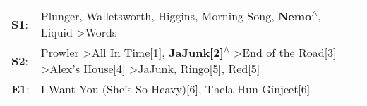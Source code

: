 \begin{supertabular}{p{0.03\textwidth}p{0.92\textwidth}}
 \textbf{S1}:  &                                                                                                 Plunger\textsuperscript{}, \enspace Walletsworth\textsuperscript{}, \enspace Higgins\textsuperscript{}, \enspace Morning Song\textsuperscript{}, \enspace \textbf{Nemo\textsuperscript{$\wedge$}}, \enspace Liquid\textsuperscript{} \textgreater \enspace Words\textsuperscript{}  \enspace  \\
 \textbf{S2}:  &  Prowler\textsuperscript{} \textgreater \enspace All In Time[1]\textsuperscript{}, \enspace \textbf{JaJunk[2]\textsuperscript{$\wedge$}} \textgreater \enspace End of the Road[3]\textsuperscript{} \textgreater \enspace Alex's House[4]\textsuperscript{} \textgreater \enspace JaJunk\textsuperscript{}, \enspace Ringo[5]\textsuperscript{}, \enspace Red[5]\textsuperscript{}  \enspace  \\
 \textbf{E1}:  &                                                                                                                                                                                                                                                                                  I Want You (She's So Heavy)[6]\textsuperscript{}, \enspace Thela Hun Ginjeet[6]\textsuperscript{}  \enspace  \\
\end{supertabular}
